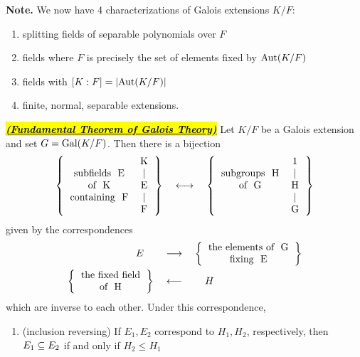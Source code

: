 \nl

\textbf{Note.} We now have 4 characterizations of Galois extensions $K/F$:
\begin{enumerate}
\item splitting fields of separable polynomials over $F$
\item fields where $F$ is precisely the set of elements fixed by $\text{Aut}(K/F)$
\item fields with $[K:F] = |\text{Aut}(K/F)|$
\item finite, normal, separable extensions.
\end{enumerate}

\nl

\begin{thm}\underline{\hl{\textbf{\textit{(Fundamental Theorem of Galois Theory)}}}}
Let $K/F$ be a Galois extension and set $G = \text{Gal}(K/F)$. Then there is a bijection
\[ 
\left \{
\begin{tabular}{cc}
& K\\
\text{subfields } E & |\\
\text{of } K & E\\
\text{containing } F & |\\
& F
\end{tabular}
\right \}\quad \longleftrightarrow \quad 
\left \{\begin{tabular}{cc}
& 1\\
\text{subgroups } H & |\\
\text{of } G & H\\
& |\\
& G
\end{tabular}\right \}
\]
given by the correspondences
\begin{align*}
E\qquad &\longrightarrow \quad\left \{\begin{tabular}{c}
\text{the elements of } G\\
\text{fixing } E
\end{tabular}\right \}\\
\left \{\begin{tabular}{c}
\text{the fixed field}\\
\text{of } H
\end{tabular}\right \}\quad &\longleftarrow\qquad H
\end{align*}
which are inverse to each other. Under this correspondence,
\begin{enumerate}
\item (inclusion reversing) If $E_1, E_2$ correspond to $H_1, H_2$, respectively, then $E_1\subseteq E_2$ if and only if $H_2\leq H_1$

\end{enumerate}
\end{thm}
